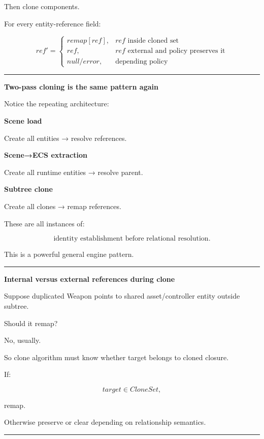 Then clone components.

For every entity-reference field:

\[
ref'=
\begin{cases}
remap[ref],&ref\text{ inside cloned set}\\
ref,&ref\text{ external and policy preserves it}\\
null/error,&\text{depending policy}
\end{cases}
\]

\begin{center}\rule{0.5\linewidth}{0.5pt}\end{center}

\textbf{Two-pass cloning is the same pattern again}

Notice the repeating architecture:

\textbf{Scene load}

Create all entities → resolve references.

\textbf{Scene→ECS extraction}

Create all runtime entities → resolve parent.

\textbf{Subtree clone}

Create all clones → remap references.

These are all instances of:

\[
\boxed{
\text{identity establishment before relational resolution}.
}
\]

This is a powerful general engine pattern.

\begin{center}\rule{0.5\linewidth}{0.5pt}\end{center}

\textbf{Internal versus external references during clone}

Suppose duplicated Weapon points to shared asset/controller entity outside subtree.

Should it remap?

No, usually.

So clone algorithm must know whether target belongs to cloned closure.

If:

\[
target\in CloneSet,
\]

remap.

Otherwise preserve or clear depending on relationship semantics.

\begin{center}\rule{0.5\linewidth}{0.5pt}\end{center}

